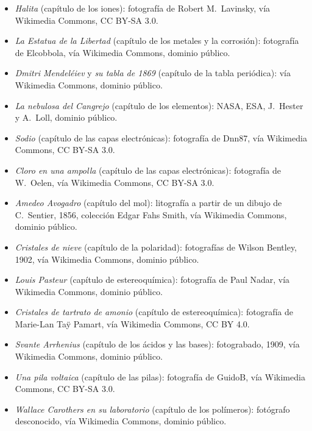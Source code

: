\begin{itemize}
        fotografía, George Grantham Bain Collection, Library of Congress,
        vía Wikimedia Commons, dominio público.
  \item \emph{Halita} (capítulo de los iones): fotografía de Robert
        M.~Lavinsky, vía Wikimedia Commons, CC BY-SA 3.0.
  \item \emph{La Estatua de la Libertad} (capítulo de los metales y la
        corrosión): fotografía de Elcobbola, vía Wikimedia Commons,
        dominio público.
  \item \emph{Dmitri Mendeléiev} y \emph{su tabla de 1869} (capítulo de la
        tabla periódica): vía Wikimedia Commons, dominio público.
  \item \emph{La nebulosa del Cangrejo} (capítulo de los elementos): NASA,
        ESA, J.~Hester y A.~Loll, dominio público.
  \item \emph{Sodio} (capítulo de las capas electrónicas): fotografía de
        Dnn87, vía Wikimedia Commons, CC BY-SA 3.0.
  \item \emph{Cloro en una ampolla} (capítulo de las capas electrónicas):
        fotografía de W.~Oelen, vía Wikimedia Commons, CC BY-SA 3.0.
  \item \emph{Amedeo Avogadro} (capítulo del mol): litografía a partir de
        un dibujo de C.~Sentier, 1856, colección Edgar Fahs Smith, vía
        Wikimedia Commons, dominio público.
  \item \emph{Cristales de nieve} (capítulo de la polaridad): fotografías
        de Wilson Bentley, 1902, vía Wikimedia Commons, dominio público.
  \item \emph{Louis Pasteur} (capítulo de estereoquímica): fotografía de
        Paul Nadar, vía Wikimedia Commons, dominio público.
  \item \emph{Cristales de tartrato de amonio} (capítulo de
        estereoquímica): fotografía de Marie-Lan Taÿ Pamart, vía Wikimedia
        Commons, CC BY 4.0.
  \item \emph{Svante Arrhenius} (capítulo de los ácidos y las bases):
        fotograbado, 1909, vía Wikimedia Commons, dominio público.
  \item \emph{Una pila voltaica} (capítulo de las pilas): fotografía de
        GuidoB, vía Wikimedia Commons, CC BY-SA 3.0.
  \item \emph{Wallace Carothers en su laboratorio} (capítulo de los
        polímeros): fotógrafo desconocido, vía Wikimedia Commons, dominio
        público.
\end{itemize}


